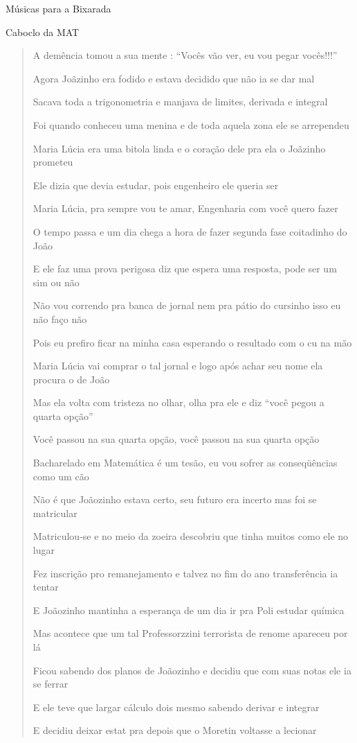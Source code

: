 \begin{secao}{Músicas para a Bixarada}
\begin{subsecao}{Caboclo da MAT}
\begin{verse}
A demência tomou a sua mente : ``Vocês vão ver, eu vou pegar vocês!!!''

Agora Joãzinho era fodido e estava decidido que não ia se dar mal

Sacava toda a trigonometria e manjava de limites, derivada e integral

Foi quando conheceu uma menina e de toda aquela zona ele se arrependeu

Maria Lúcia era uma bitola linda e o coração dele pra ela o Joãzinho prometeu

Ele dizia que devia estudar, pois engenheiro ele queria ser

Maria Lúcia, pra sempre vou te amar, Engenharia com você quero fazer

O tempo passa e um dia chega a hora de fazer segunda fase coitadinho do João

E ele faz uma prova perigosa diz que espera uma resposta, pode ser um sim ou
não

Não vou correndo pra banca de jornal nem pra pátio do cursinho isso eu não faço
não

Pois eu prefiro ficar na minha casa esperando o resultado com o cu na mão

Maria Lúcia vai comprar o tal jornal e logo após achar seu nome ela procura o
de João

Mas ela volta com tristeza no olhar, olha pra ele e diz ``você pegou a quarta
opção''

Você passou na sua quarta opção, você passou na sua quarta opção

Bacharelado em Matemática é um tesão, eu vou sofrer as conseqüências como um
cão

Não é que Joãozinho estava certo, seu futuro era incerto mas foi se matricular

Matriculou-se e no meio da zoeira descobriu que tinha muitos como ele no lugar

Fez inscrição pro remanejamento e talvez no fim do ano transferência ia tentar

E Joãozinho mantinha a esperança de um dia ir pra Poli estudar química

Mas acontece que um tal Professorzzini terrorista de renome apareceu por lá

Ficou sabendo dos planos de Joãozinho e decidiu que com suas notas ele ia se
ferrar

E ele teve que largar cálculo dois mesmo sabendo derivar e integrar

E decidiu deixar estat pra depois que o Moretin voltasse a lecionar


\end{verse}
\end{subsecao}
\end{secao}
